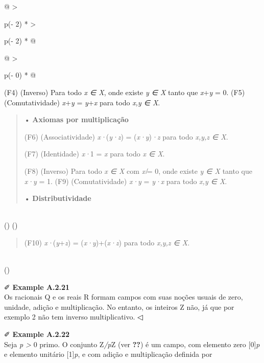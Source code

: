 \documentclass[
]{article}
\begin{document}
\begin{longtable}[]{@{}
  >{\raggedright\arraybackslash}p{(\columnwidth - 2\tabcolsep) * }
  >{\raggedright\arraybackslash}p{(\columnwidth - 2\tabcolsep) * }@{}}
{\begin{minipage}[t]{\linewidth}
\begin{longtable}[]{@{}
  >{\raggedright\arraybackslash}p{(\columnwidth - 0\tabcolsep) * }@{}}
\begin{minipage}[b]{\linewidth}
(F4) (Inverso) Para todo \emph{x ∈ X}, onde existe \emph{y ∈ X} tanto
que \emph{x}+\emph{y} = 0. (F5) (Comutatividade) \emph{x}+\emph{y} =
\emph{y}+\emph{x} para todo \emph{x,y ∈ X}.

\begin{quote}
• \textbf{Axiomas por multiplicação}

(F6) (Associatividade) \emph{x·}(\emph{y·z}) = (\emph{x·y})\emph{·z}
para todo \emph{x,y,z ∈ X}.

(F7) (Identidade) \emph{x·}1 = \emph{x} para todo \emph{x ∈ X}.

(F8) (Inverso) Para todo \emph{x ∈ X} com \emph{x ̸}= 0, onde existe
\emph{y ∈ X} tanto que \emph{x·y} = 1. (F9) (Comutatividade) \emph{x·y}
= \emph{y·x} para todo \emph{x,y ∈ X}.

• \textbf{Distributividade}
\end{quote}
\end{minipage} \\
\midrule()
\endhead
\bottomrule()
\end{longtable}

\begin{quote}
(F10) \emph{x·}(\emph{y}+\emph{z}) = (\emph{x·y})+(\emph{x·z}) para todo
\emph{x,y,z ∈ X}.
\end{quote}
\end{minipage}} \\
\bottomrule()
\end{longtable}

✐ \textbf{Example A.2.21}\\
Os racionais Q e os reais R formam campos com suas noções usuais de
zero, unidade, adição e multiplicação. No entanto, os inteiros Z não, já
que por exemplo 2 não tem inverso multiplicativo. ◁

✐ \textbf{Example A.2.22}\\
Seja \emph{p \textgreater{}} 0 primo. O conjunto Z\emph{/p}Z (ver
\textbf{??}) é um campo, com elemento zero {[}0{]}\emph{p} e elemento
unitário {[}1{]}\emph{p}, e com adição e multiplicação definida por
\end{document}
